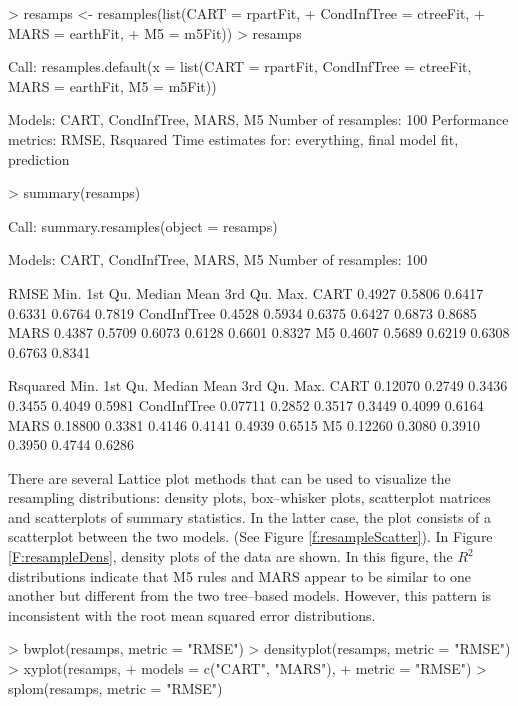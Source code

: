 \documentclass[12pt]{article}
\renewenvironment{Schunk}{\vspace{\topsep}}{\vspace{\topsep}}
\begin{document}
\begin{Schunk}
\begin{Sinput}
> resamps <- resamples(list(CART = rpartFit,
+                           CondInfTree = ctreeFit,
+                           MARS = earthFit,
+                           M5 = m5Fit))
> resamps
\end{Sinput}
\begin{Soutput}
Call:
resamples.default(x = list(CART = rpartFit, CondInfTree = ctreeFit,     MARS = earthFit, M5 = m5Fit))

Models: CART, CondInfTree, MARS, M5 
Number of resamples: 100 
Performance metrics: RMSE, Rsquared 
Time estimates for: everything, final model fit, prediction 
\end{Soutput}
\begin{Sinput}
> summary(resamps)
\end{Sinput}
\begin{Soutput}
Call:
summary.resamples(object = resamps)

Models: CART, CondInfTree, MARS, M5 
Number of resamples: 100 

RMSE 
              Min. 1st Qu. Median   Mean 3rd Qu.   Max.
CART        0.4927  0.5806 0.6417 0.6331  0.6764 0.7819
CondInfTree 0.4528  0.5934 0.6375 0.6427  0.6873 0.8685
MARS        0.4387  0.5709 0.6073 0.6128  0.6601 0.8327
M5          0.4607  0.5689 0.6219 0.6308  0.6763 0.8341

Rsquared 
               Min. 1st Qu. Median   Mean 3rd Qu.   Max.
CART        0.12070  0.2749 0.3436 0.3455  0.4049 0.5981
CondInfTree 0.07711  0.2852 0.3517 0.3449  0.4099 0.6164
MARS        0.18800  0.3381 0.4146 0.4141  0.4939 0.6515
M5          0.12260  0.3080 0.3910 0.3950  0.4744 0.6286
\end{Soutput}
\end{Schunk}

There are several Lattice plot methods that can be used to visualize
the resampling distributions: density plots, box--whisker plots,
scatterplot matrices and scatterplots of summary statistics. In the
latter case, the plot consists of a scatterplot between the two
models.  (See Figure
\ref{f:resampleScatter}). In Figure \ref{F:resampleDens}, density plots
of the data are shown. In this figure,  the $R^2$ distributions
indicate that M5 rules and MARS appear to be
similar to one another but different from the two tree--based
models. However, this pattern is inconsistent with the root
mean squared error distributions.

\begin{Schunk}
\begin{Sinput}
> bwplot(resamps, metric = "RMSE")
> densityplot(resamps, metric = "RMSE")
> xyplot(resamps,
+        models = c("CART", "MARS"),
+        metric = "RMSE")
> splom(resamps, metric = "RMSE")
\end{Sinput}
\end{Schunk}
\end{document}
